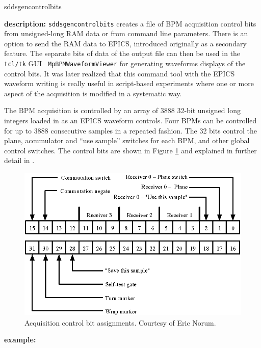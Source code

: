 \begin{sddsprog}{sddsgencontrolbits}
\item {\bf description:}
\verb+sddsgencontrolbits+ creates a file of BPM acquisition control
bits from unsigned-long RAM data or from command line
parameters. There is an option to send the RAM data to EPICS,
introduced originally as a secondary feature. The separate bits of
data of the output file can then be used in the {\tt tcl/tk} GUI {\tt
MpBPMWaveformViewer} for generating waveforms displays of the control
bits. It was later realized that this command tool with the EPICS
waveform writing is really useful in script-based experiments where one
or more aspect of the acquisition is modified in a systematic way.

The BPM acquisition is controlled by an array of 3888 32-bit unsigned
long integers loaded in as an EPICS waveform controls. Four BPMs can
be controlled for up to 3888 consecutive samples in a repeated
fashion.  The 32 bits control the plane, accumulator and ``use
sample'' switches for each BPM, and other global control switches. The
control bits are shown in Figure \ref{fig:acquisitionControlRam} and
explained in further detail in \cite{Norum2007}.

\begin{figure}[htb]
\centering
\includegraphics[width=\textwidth]{acquisitionControlRam.eps}
\caption{Acquisition control bit assignments. Courtesy of Eric Norum.}
\label{fig:acquisitionControlRam}
\end{figure}

\item {\bf example:} 
% 


\end{sddsprog}
